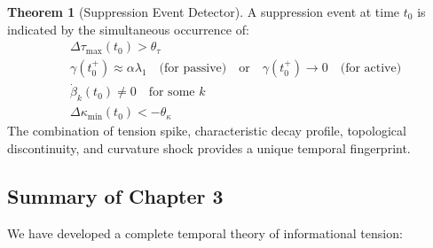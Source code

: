 \documentclass[12pt,a4paper]{article}
\theoremstyle{definition}
\newtheorem{theorem}{Theorem}[section]
\theoremstyle{remark}
\begin{document}
\begin{theorem}[Suppression Event Detector]
\label{thm:detector-temporal}
A suppression event at time $t_0$ is indicated by the simultaneous occurrence of:
\begin{equation}
    \boxed{
    \begin{aligned}
        &\Delta\tau_{\max}(t_0) > \theta_\tau \\
        &\gamma(t_0^+) \approx \alpha\lambda_1 \quad \text{(for passive)} \quad \text{or} \quad \gamma(t_0^+) \to 0 \quad \text{(for active)} \\
        &\dot{\beta}_k(t_0) \neq 0 \quad \text{for some } k \\
        &\Delta\kappa_{\min}(t_0) < -\theta_\kappa
    \end{aligned}
    }
\end{equation}
The combination of tension spike, characteristic decay profile, topological discontinuity, and curvature shock provides a unique temporal fingerprint.
\end{theorem}

\subsection{Summary of Chapter 3}

We have developed a complete temporal theory of informational tension:
\end{document}
